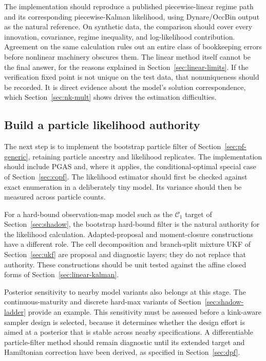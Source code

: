 \documentclass[11pt]{article}
\begin{document}
The implementation should reproduce a published piecewise-linear regime path and its corresponding piecewise-Kalman likelihood, using Dynare/OccBin output as the natural reference. On synthetic data, the comparison should cover every innovation, covariance, regime inequality, and log-likelihood contribution. Agreement on the same calculation rules out an entire class of bookkeeping errors before nonlinear machinery obscures them. The linear method itself cannot be the final answer, for the reasons explained in Section~\ref{sec:linear-limits}. If the verification fixed point is not unique on the test data, that nonuniqueness should be recorded. It is direct evidence about the model's solution correspondence, which Section~\ref{sec:nk-mult} shows drives the estimation difficulties.

\subsection*{Build a particle likelihood authority}

The next step is to implement the bootstrap particle filter of Section~\ref{sec:pf-generic}, retaining particle ancestry and likelihood replicates. The implementation should include PGAS and, where it applies, the conditional-optimal special case of Section~\ref{sec:copf}. The likelihood estimator should first be checked against exact enumeration in a deliberately tiny model. Its variance should then be measured across particle counts.

For a hard-bound observation-map model such as the $\mathcal{C}_1$ target of Section~\ref{sec:shadow}, the bootstrap hard-bound filter is the natural authority for the likelihood calculation. Adapted-proposal and moment-closure constructions have a different role. The cell decomposition and branch-split mixture UKF of Section~\ref{sec:ukf} are proposal and diagnostic layers; they do not replace that authority. These constructions should be unit tested against the affine closed forms of Section~\ref{sec:linear-kalman}.

Posterior sensitivity to nearby model variants also belongs at this stage. The continuous-maturity and discrete hard-max variants of Section~\ref{sec:shadow-ladder} provide an example. This sensitivity must be assessed before a kink-aware sampler design is selected, because it determines whether the design effort is aimed at a posterior that is stable across nearby specifications. A differentiable particle-filter method should remain diagnostic until its extended target and Hamiltonian correction have been derived, as specified in Section~\ref{sec:dpf}.
\end{document}
